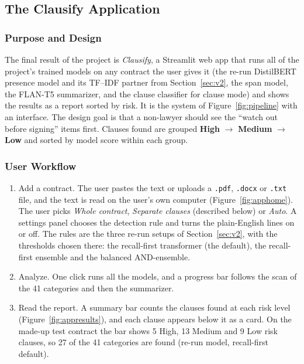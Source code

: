\subsection{The Clausify Application}
\label{sec:clausify}
\subsubsection{Purpose and Design}
The final result of the project is \emph{Clausify}, a Streamlit web app that runs all of the project's trained models on any contract the user gives it (the re-run DistilBERT presence model and its TF--IDF partner from Section~\ref{sec:v2}, the span model, the FLAN-T5 summarizer, and the clause classifier for clause mode) and shows the results as a report sorted by risk. It is the system of Figure~\ref{fig:pipeline} with an interface. The design goal is that a non-lawyer should see the ``watch out before signing'' items first. Clauses found are grouped \textcolor{riskhigh}{\textbf{High}} $\rightarrow$ \textcolor{riskmed}{\textbf{Medium}} $\rightarrow$ \textcolor{risklow}{\textbf{Low}} and sorted by model score within each group.
\subsubsection{User Workflow}
\begin{enumerate}[itemsep=2pt]
  \item Add a contract. The user pastes the text or uploads a \texttt{.pdf}, \texttt{.docx} or \texttt{.txt} file, and the text is read on the user's own computer (Figure~\ref{fig:apphome}). The user picks \emph{Whole contract}, \emph{Separate clauses} (described below) or \emph{Auto}. A settings panel chooses the detection rule and turns the plain-English lines on or off. The rules are the three re-run setups of Section~\ref{sec:v2}, with the thresholds chosen there: the recall-first transformer (the default), the recall-first ensemble and the balanced AND-ensemble.
  \item Analyze. One click runs all the models, and a progress bar follows the scan of the 41 categories and then the summarizer.
  \item Read the report. A summary bar counts the clauses found at each risk level (Figure~\ref{fig:appresults}), and each clause appears below it as a card. On the made-up test contract the bar shows 5 High, 13 Medium and 9 Low risk clauses, so 27 of the 41 categories are found (re-run model, recall-first default).
\end{enumerate}

